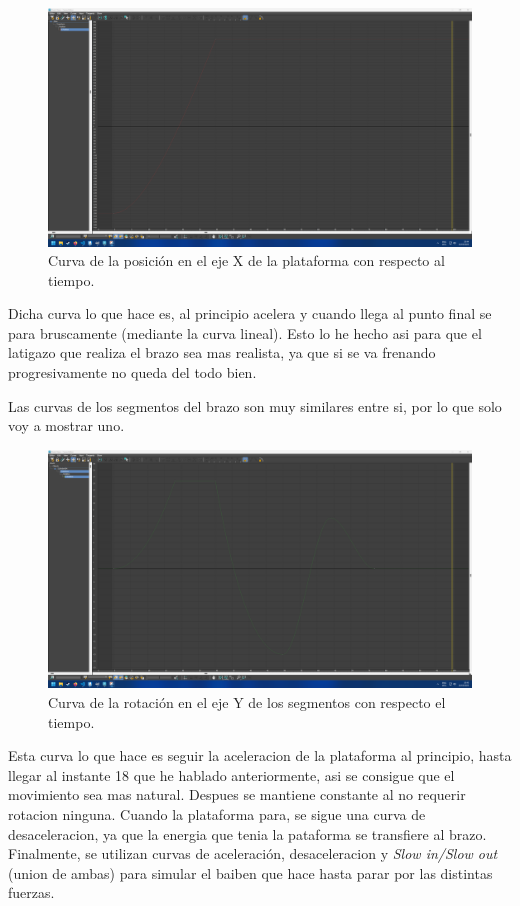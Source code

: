 \documentclass{article}
\begin{document}
\begin{figure}[H]
    \centering
    \includegraphics[width=\textwidth]{imagenes/Ejercicio4/curvas/base/red.png}
    \caption{Curva de la posición en el eje X de la plataforma con respecto al tiempo.}
\end{figure}


Dicha curva lo que hace es, al principio acelera y cuando llega al punto final se para bruscamente (mediante la curva lineal). Esto lo he hecho asi para que el latigazo que realiza el brazo sea mas realista, ya que si se va frenando progresivamente no queda del todo bien.

Las curvas de los segmentos del brazo son muy similares entre si, por lo que solo voy a mostrar uno.

\begin{figure}[H]
    \centering
    \includegraphics[width=\textwidth]{imagenes/Ejercicio4/curvas/segmentos/green.png}
    \caption{Curva de la rotación en el eje Y de los segmentos con respecto el tiempo.}
\end{figure}

Esta curva lo que hace es seguir la aceleracion de la plataforma al principio, hasta llegar al instante 18 que he hablado anteriormente, asi se consigue que el movimiento sea mas natural. Despues se mantiene constante al no requerir rotacion ninguna. Cuando la plataforma para, se sigue una curva de desaceleracion, ya que la energia que tenia la pataforma se transfiere al brazo. Finalmente, se utilizan curvas de aceleración, desaceleracion y \textit{Slow in/Slow out} (union de ambas) para simular el baiben que hace hasta parar por las distintas fuerzas.
\end{document}
